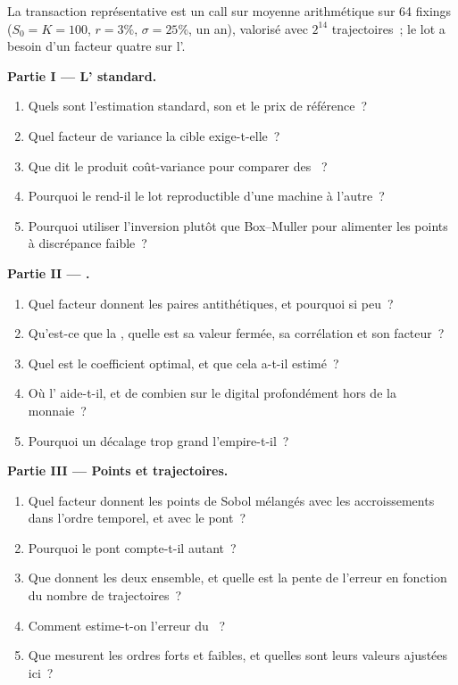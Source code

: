 \begin{problem}\label{pb:qm:monte-carlo:1}
La transaction représentative est un call sur moyenne arithmétique sur 64 fixings ($S_0 = K = 100$, $r = 3\%$, $\sigma = 25\%$, un an), valorisé avec $2^{14}$ trajectoires~; le lot a besoin d'un facteur quatre sur l'.

\medskip\noindent\textbf{Partie I --- L' standard.}
\begin{enumerate}
\item Quels sont l'estimation standard, son  et le prix de référence~?
\item Quel facteur de variance la cible exige-t-elle~?
\item Que dit le produit coût-variance pour comparer des ~?
\item Pourquoi le  rend-il le lot reproductible d'une machine à l'autre~?
\item Pourquoi utiliser l'inversion plutôt que Box--Muller pour alimenter les points à discrépance faible~?
\end{enumerate}

\medskip\noindent\textbf{Partie II --- .}
\begin{enumerate}[resume]
\item Quel facteur donnent les paires antithétiques, et pourquoi si peu~?
\item Qu'est-ce que la , quelle est sa valeur fermée, sa corrélation et son facteur~?
\item Quel est le coefficient optimal, et que cela a-t-il estimé~?
\item Où l' aide-t-il, et de combien sur le digital profondément hors de la monnaie~?
\item Pourquoi un décalage trop grand l'empire-t-il~?
\end{enumerate}

\medskip\noindent\textbf{Partie III --- Points et trajectoires.}
\begin{enumerate}[resume]
\item Quel facteur donnent les points de Sobol mélangés avec les accroissements dans l'ordre temporel, et avec le pont~?
\item Pourquoi le pont compte-t-il autant~?
\item Que donnent les deux ensemble, et quelle est la pente de l'erreur en fonction du nombre de trajectoires~?
\item Comment estime-t-on l'erreur du ~?
\item Que mesurent les ordres forts et faibles, et quelles sont leurs valeurs ajustées ici~?
\end{enumerate}


\end{problem}

